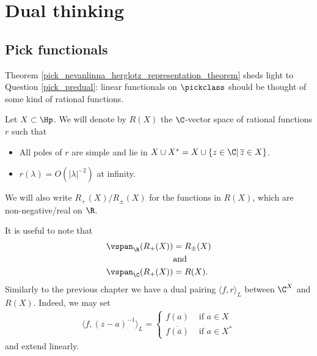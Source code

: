 \section{Dual thinking}
\subsection{Pick functionals}

Theorem \ref{pick_nevanlinna_herglotz_representation_theorem} sheds light to Question \ref{pick_predual}: linear functionals on $\pickclass$ should be thought of some kind of rational functions.
\begin{maar}
	Let $X \subset \Hp$. We will denote by $R(X)$ the $\C$-vector space of rational functions $r$ such that
	\begin{itemize}
		\item All poles of $r$ are simple and lie in $X \cup X^{*} = X \cup \{z \in \C |\, \overline{z} \in X\}$.
		\item $r(\lambda) = O(|\lambda|^{-2})$ at infinity.
	\end{itemize}
	We will also write $R_{+}(X)/R_{\pm}(X)$ for the functions in $R(X)$, which are non-negative/real on $\R$.
\end{maar}
It is useful to note that
\begin{align}\label{pick_functional_span}
	\vspan_{\R}(R_{+}(X)) &= R_{\pm}(X) \nonumber \\
	&\text{and} \\
	\vspan_{\C}(R_{+}(X)) &= R(X). \nonumber
\end{align}
Similarly to the previous chapter we have a dual pairing $\langle f, r \rangle_{L}$ between $\C^{X}$ and $R(X)$. Indeed, we may set
\begin{align*}
	\langle f, (z - a)^{-1} \rangle_{L} =
	\begin{cases}
		f(a) & \text{ if $a \in X$} \\
		\overline{f(\overline{a})} & \text{ if $a \in X^{*}$}
	\end{cases}
\end{align*}
and extend linearly.

